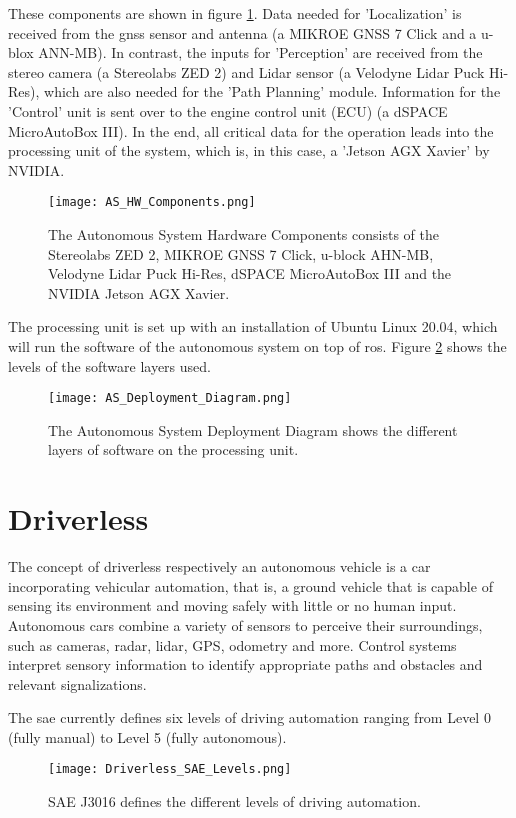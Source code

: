 These components are shown in figure \ref{fig:AS HW Components}. Data needed for 'Localization' is received from the \acrshort{gnss} sensor and antenna (a MIKROE GNSS 7 Click and a u-blox ANN-MB). In contrast, the inputs for 'Perception' are received from the stereo camera (a Stereolabs ZED 2) and Lidar sensor (a Velodyne Lidar Puck Hi-Res), which are also needed for the 'Path Planning' module. Information for the 'Control' unit is sent over to the engine control unit (ECU) (a dSPACE MicroAutoBox III). In the end, all critical data for the operation leads into the processing unit of the system, which is, in this case, a 'Jetson AGX Xavier' by NVIDIA.
\begin{figure}[H]
    \centering
    \texttt{[image: AS\_HW\_Components.png]}
    \caption{The Autonomous System Hardware Components consists of the Stereolabs ZED 2, MIKROE GNSS 7 Click, u-block AHN-MB, Velodyne Lidar Puck Hi-Res, dSPACE MicroAutoBox III and the NVIDIA Jetson AGX Xavier.}
    \label{fig:AS HW Components}
\end{figure}

The processing unit is set up with an installation of Ubuntu Linux 20.04, which will run the software of the autonomous system on top of \acrshort{ros}. Figure \ref{fig:AS Deployment Diagram} shows the levels of the software layers used.
\begin{figure}[H]
    \centering
    \texttt{[image: AS\_Deployment\_Diagram.png]}
    \caption{The Autonomous System Deployment Diagram shows the different layers of software on the processing unit.}
    \label{fig:AS Deployment Diagram}
\end{figure}

\section{Driverless} \label{sec:Driverless}
The concept of driverless respectively an autonomous vehicle is a car incorporating vehicular automation, that is, a ground vehicle that is capable of sensing its environment and moving safely with little or no human input. \cite{driverless_cooperative_control}
Autonomous cars combine a variety of sensors to perceive their surroundings, such as cameras, radar, lidar, GPS, odometry and more. Control systems interpret sensory information to identify appropriate paths and obstacles and relevant signalizations. \cite{driverless_governing_autonomous_vehicles}

The \acrshort{sae} currently defines six levels of driving automation ranging from Level 0 (fully manual) to Level 5 (fully autonomous). \cite{driverless_sae_levels}
\begin{figure}[H]
    \centering
    \texttt{[image: Driverless\_SAE\_Levels.png]}
    \caption{SAE J3016 defines the different levels of driving automation.}
    \label{fig:Driverless SAE Levels}
\end{figure}

